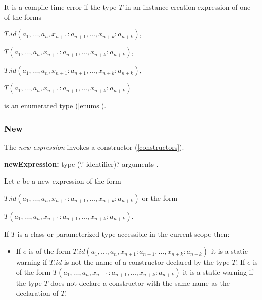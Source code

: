\documentclass{article}
\begin{document}
\LMHash{}
It is a compile-time error if the type $T$ in an instance creation expression of one of the forms

\NEW{} $T.id(a_1, \ldots , a_n, x_{n+1}: a_{n+1}, \ldots , x_{n+k}: a_{n+k})$,

\NEW{} $T(a_1, \ldots , a_n, x_{n+1}: a_{n+1}, \ldots , x_{n+k}: a_{n+k})$,

\CONST{} $T.id(a_1, \ldots , a_n, x_{n+1}: a_{n+1}, \ldots , x_{n+k}: a_{n+k})$,

\CONST{} $T(a_1, \ldots , a_n, x_{n+1}: a_{n+1}, \ldots , x_{n+k}: a_{n+k})$

is an enumerated type (\ref{enums}).


\subsubsection{ New}

\LMHash{}
The {\em new expression} invokes a constructor (\ref{constructors}).

\begin{grammar}
{\bf newExpression:}
\NEW{} type (`{\escapegrammar .}' identifier)? arguments
.
\end{grammar}

\LMHash{}
Let $e$ be a new expression of the form

\NEW{} $T.id(a_1, \ldots , a_n, x_{n+1}: a_{n+1}, \ldots , x_{n+k}: a_{n+k})$ or the form

\NEW{} $T(a_1, \ldots , a_n, x_{n+1}: a_{n+1}, \ldots , x_{n+k}: a_{n+k})$.



\LMHash{}
If $T$ is  a class or parameterized type accessible in the current scope then:
\begin{itemize}
\item
If $e$ is of the form \NEW{} $T.id(a_1, \ldots , a_n, x_{n+1}: a_{n+1}, \ldots , x_{n+k}: a_{n+k})$ it is a static warning if $T.id$ is not the name of a constructor declared by the type $T$. If $e$ is of the form  \NEW{} $T(a_1, \ldots , a_n, x_{n+1}: a_{n+1}, \ldots , x_{n+k}: a_{n+k})$ it is a static warning if the type $T$ does not declare a constructor with the same name as the declaration of $T$.
\end{itemize}
\end{document}
